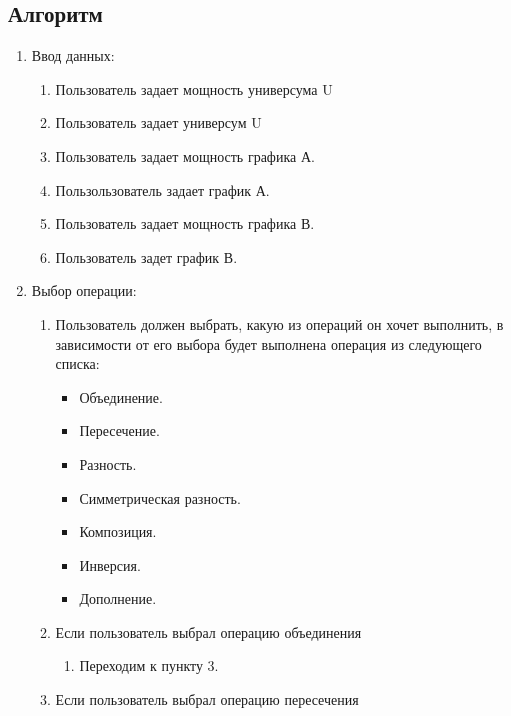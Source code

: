 \documentclass[a4paper,12pt]{extarticle}
\begin{document}
\begin{center}
\section*{Алгоритм}
\end{center}
\begin{enumerate}
  \item Ввод данных:
  \begin{enumerate}[label*=\arabic*.]
    \item Пользователь задает мощность универсума U
    \item Пользователь задает универсум U
    \item Пользователь задает мощность графика А.
    \item Пользользователь задает график А.
    \item Пользователь задает мощность графика В.
    \item Пользователь задет график В.
  \end{enumerate}
  \item Выбор операции:
  \begin{enumerate}[label*=\arabic*.]
    \item Пользователь должен выбрать, какую из операций он хочет выполнить, в зависимости от его выбора будет выполнена операция из следующего списка:
    \begin{itemize}
      \item Объединение.
      \item Пересечение.
      \item Разность.
      \item Симметрическая разность.
      \item Композиция.
      \item Инверсия.
      \item Дополнение.
    \end{itemize}
    \item Если пользователь выбрал операцию объединения
    \begin{enumerate}[label*=\arabic*.]
      \item Переходим к пункту 3.
    \end{enumerate}
    \item Если пользователь выбрал операцию пересечения
    \begin{enumerate}[label*=\arabic*.]

\end{enumerate}
\end{enumerate}
\end{enumerate}
\end{document}

